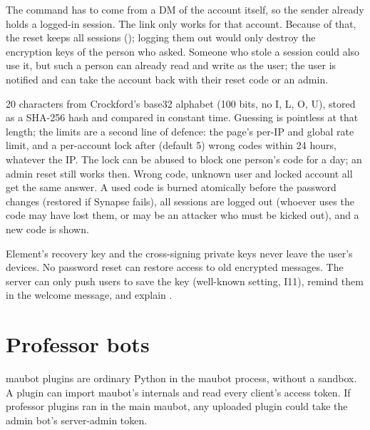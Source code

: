 \begin{description}[style=nextline,leftmargin=1.5em,font=\normalfont\bfseries]
  \item[\cmd{!password}]
    The command has to come from a DM of the account itself, so the sender already holds a
    logged-in session. The link only works for that account. Because of that, the reset
    keeps all sessions (); logging them out would only destroy
    the encryption keys of the person who asked. Someone who stole a session could also use
    it, but such a person can already read and write as the user; the user is notified and
    can take the account back with their reset code or an admin.
  \item[Reset codes]
    20 characters from Crockford's base32 alphabet (100 bits, no I, L, O, U), stored as a
    SHA-256 hash and compared in constant time. Guessing is pointless at that length; the
    limits are a second line of defence: the page's per-IP and global rate limit, and a
    per-account lock after  (default 5) wrong codes within
    24 hours, whatever the IP. The lock can be abused to block one person's code for a day;
    an admin reset still works then. Wrong code, unknown user and locked account all get the
    same answer. A used code is burned atomically before the password changes (restored if
    Synapse fails), all sessions are logged out (whoever uses the code may have lost them,
    or may be an attacker who must be kicked out), and a new code is shown.
  \item[What can't be fixed]
    Element's recovery key and the cross-signing private keys never leave the user's
    devices. No password reset can restore access to old encrypted messages. The server can
    only push users to save the key (well-known setting, I11), remind them in the welcome
    message, and explain .
\end{description}

\section{Professor bots}
\label{sec:why-userbots}

maubot plugins are ordinary Python in the maubot process, without a sandbox. A plugin can
import maubot's internals and read every client's access token. If professor plugins ran in
the main maubot, any uploaded plugin could take the admin bot's server-admin token.

